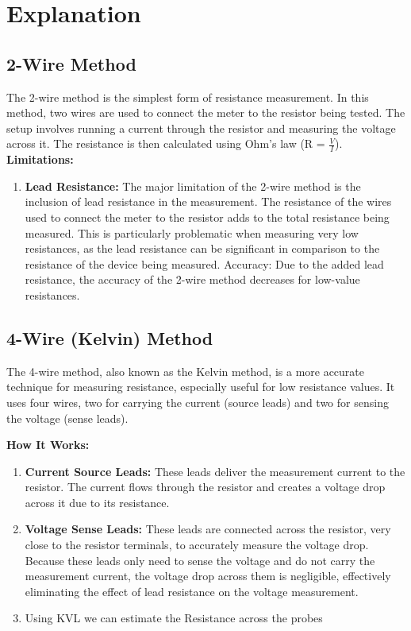 \documentclass[a4paper,11pt]{article}%
\begin{document}
\section{Explanation}

\subsection{2-Wire Method}
The 2-wire method is the simplest form of resistance measurement. In this method, two wires are used to connect the meter to the resistor being tested. The setup involves running a current through the resistor and measuring the voltage across it. The resistance is then calculated using Ohm's law (R = $\frac{V}{I}$).\\

\textbf{Limitations:}
\begin{enumerate}
	\item \textbf{Lead Resistance:} The major limitation of the 2-wire method is the inclusion of lead resistance in the measurement. The resistance of the wires used to connect the meter to the resistor adds to the total resistance being measured. This is particularly problematic when measuring very low resistances, as the lead resistance can be significant in comparison to the resistance of the device being measured.
	Accuracy: Due to the added lead resistance, the accuracy of the 2-wire method decreases for low-value resistances.
\end{enumerate}

\subsection{4-Wire (Kelvin) Method}
The 4-wire method, also known as the Kelvin method, is a more accurate technique for measuring resistance, especially useful for low resistance values. It uses four wires, two for carrying the current (source leads) and two for sensing the voltage (sense leads).

\textbf{How It Works:}
\begin{enumerate}
	\item \textbf{Current Source Leads:} These leads deliver the measurement current to the resistor. The current flows through the resistor and creates a voltage drop across it due to its resistance.
	\item \textbf{Voltage Sense Leads:} These leads are connected across the resistor, very close to the resistor terminals, to accurately measure the voltage drop. Because these leads only need to sense the voltage and do not carry the measurement current, the voltage drop across them is negligible, effectively eliminating the effect of lead resistance on the voltage measurement.
	\item Using KVL we can estimate the Resistance across the probes
\end{enumerate}
\end{document}
